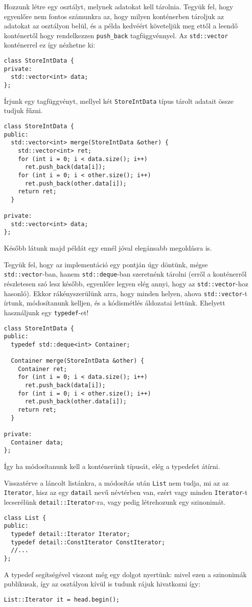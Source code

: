 \documentclass[../cpp_book/cpp_book.tex]{subfiles}
\begin{document}
	\smallskip
	Hozzunk létre egy osztályt, melynek adatokat kell tárolnia. Tegyük fel, hogy egyenlőre nem fontos számunkra az, hogy milyen konténerben tároljuk az adatokat az osztályon belül, és a példa kedvéért követeljük meg ettől a leendő konténertől hogy rendelkezzen \texttt{push\_back} tagfüggvénnyel. Az \texttt{std::vector} konténerrel ez így nézhetne ki:
	\begin{lstlisting}
class StoreIntData {
private:
  std::vector<int> data;
};
	\end{lstlisting}
	Írjunk egy tagfüggvényt, mellyel két \texttt{StoreIntData} típus tárolt adatait össze tudjuk fűzni.
	\begin{lstlisting}
class StoreIntData {
public:
  std::vector<int> merge(StoreIntData &other) {
    std::vector<int> ret;
    for (int i = 0; i < data.size(); i++)
      ret.push_back(data[i]);
    for (int i = 0; i < other.size(); i++)
      ret.push_back(other.data[i]);
    return ret;
  }

private:
  std::vector<int> data;
};
	\end{lstlisting}
	\begin{note}
		Később látunk majd példát egy ennél jóval elegánsabb megoldásra is.
	\end{note}
	Tegyük fel, hogy az implementáció egy pontján úgy döntünk, mégse \texttt{std::vector}-ban, hanem \texttt{std::deque}-ban szeretnénk tárolni (erről a konténerről részletesen szó lesz később, egyenlőre legyen elég annyi, hogy az \texttt{std::vector}-hoz hasonló). Ekkor rákényszerülünk arra, hogy minden helyen, ahova \texttt{std::vector}-t írtunk, módosítanunk kelljen, és a kódismétlés áldozatai lettünk. Ehelyett használjunk egy \texttt{typedef}-et!
	\begin{lstlisting}
class StoreIntData {
public:
  typedef std::deque<int> Container;

  Container merge(StoreIntData &other) {
    Container ret;
    for (int i = 0; i < data.size(); i++)
      ret.push_back(data[i]);
    for (int i = 0; i < other.size(); i++)
      ret.push_back(other.data[i]);
    return ret;
  }

private:
  Container data;
};
	\end{lstlisting}
	Így ha módosítanunk kell a konténerünk típusát, elég a typedefet átírni.
	\medskip
	
	Visszatérve a láncolt listánkra, a módosítás után \texttt{List} nem tudja, mi az az \texttt{Iterator}, hisz az egy \texttt{datail} nevű névtérben van, ezért vagy minden \texttt{Iterator}-t lecserélünk \texttt{detail::Iterator}-ra, vagy pedig létrehozunk egy szinonimát.
	\begin{lstlisting}
class List {
public:
  typedef detail::Iterator Iterator;
  typedef detail::ConstIterator ConstIterator;
  //...
};
	\end{lstlisting}
	A typedef segítségével viszont még egy dolgot nyertünk: mivel ezen a szinonimák publikusak, így az osztályon kívül is tudunk rájuk hivatkozni így:
	\begin{lstlisting}
List::Iterator it = head.begin();
	\end{lstlisting}
	
	
\end{document}
